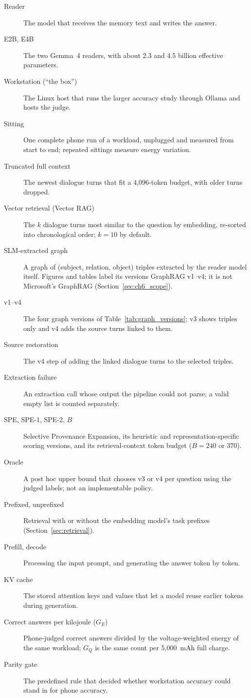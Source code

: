 \begin{description}
  \item[Reader] The model that receives the memory text and writes the answer.
  \item[E2B, E4B] The two Gemma~4 readers, with about 2.3 and 4.5 billion effective parameters.
  \item[Workstation (``the box'')] The Linux host that runs the larger accuracy study through
        Ollama and hosts the judge.
  \item[Sitting] One complete phone run of a workload, unplugged and measured from start to end;
        repeated sittings measure energy variation.
  \item[Truncated full context] The newest dialogue turns that fit a 4,096-token budget, with
        older turns dropped.
  \item[Vector retrieval (Vector RAG)] The $k$ dialogue turns most similar to the question by
        embedding, re-sorted into chronological order; $k=10$ by default.
  \item[SLM-extracted graph] A graph of (subject, relation, object) triples extracted by the reader
        model itself. Figures and tables label its versions GraphRAG v1--v4; it is not Microsoft's
        GraphRAG (Section~\ref{sec:ch6_scope}).
  \item[v1--v4] The four graph versions of Table~\ref{tab:graph_versions}; v3 shows triples only and
        v4 adds the source turns linked to them.
  \item[Source restoration] The v4 step of adding the linked dialogue turns to the selected
        triples.
  \item[Extraction failure] An extraction call whose output the pipeline could not parse; a valid
        empty list is counted separately.
  \item[SPE, SPE-1, SPE-2, $B$] Selective Provenance Expansion, its heuristic and
        representation-specific scoring versions, and its retrieval-context token budget
        ($B=240$ or $370$).
  \item[Oracle] A post hoc upper bound that chooses v3 or v4 per question using the judged labels;
        not an implementable policy.
  \item[Prefixed, unprefixed] Retrieval with or without the embedding model's task prefixes
        (Section~\ref{sec:retrieval}).
  \item[Prefill, decode] Processing the input prompt, and generating the answer token by token.
  \item[KV cache] The stored attention keys and values that let a model reuse earlier tokens during
        generation.
  \item[Correct answers per kilojoule ($G_E$)] Phone-judged correct answers divided by the
        voltage-weighted energy of the same workload; $G_Q$ is the same count per 5,000~mAh full
        charge.
  \item[Parity gate] The predefined rule that decided whether workstation accuracy could stand in
        for phone accuracy.
\end{description}
